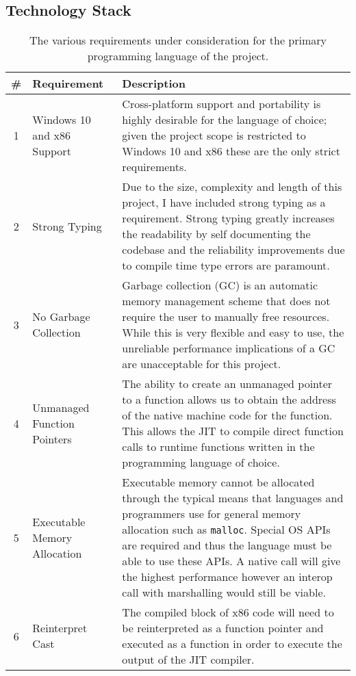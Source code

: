 \subsection{Technology Stack}


\begin{table}[H]
    \centering
    \begin{tabularx}{\linewidth}{c|l|X}
        \toprule
        \textbf{\#} & \textbf{Requirement} & \textbf{Description} \\
        \midrule
        1 & Windows 10 and x86 Support & Cross-platform support and portability is highly desirable for the language of choice; given the project scope is restricted to Windows 10 and x86 these are the only strict requirements. \\
        \midrule
        2 & Strong Typing & Due to the size, complexity and length of this project, I have included strong typing as a requirement. Strong typing greatly increases the readability by self documenting the codebase and the reliability improvements due to compile time type errors are paramount. \\
        \midrule
        3 & No Garbage Collection & Garbage collection (GC) is an automatic memory management scheme that does not require the user to manually free resources. While this is very flexible and easy to use, the unreliable performance implications of a GC are unacceptable for this project. \\
        \midrule
        4 & Unmanaged Function Pointers & The ability to create an unmanaged pointer to a function allows us to obtain the address of the native machine code for the function. This allows the JIT to compile direct function calls to runtime functions written in the programming language of choice. \\
        \midrule
        5 & Executable Memory Allocation & Executable memory cannot be allocated through the typical means that languages and programmers use for general memory allocation such as \texttt{malloc}. Special OS APIs are required and thus the language must be able to use these APIs. A native call will give the highest performance however an interop call with marshalling would still be viable. \\
        \midrule
        6 & Reinterpret Cast & The compiled block of x86 code will need to be reinterpreted as a function pointer and executed as a function in order to execute the output of the JIT compiler. \\
        \bottomrule
    \end{tabularx}
    \caption{The various requirements under consideration for the primary programming language of the project.}
    \label{list:req-features}
\end{table}


